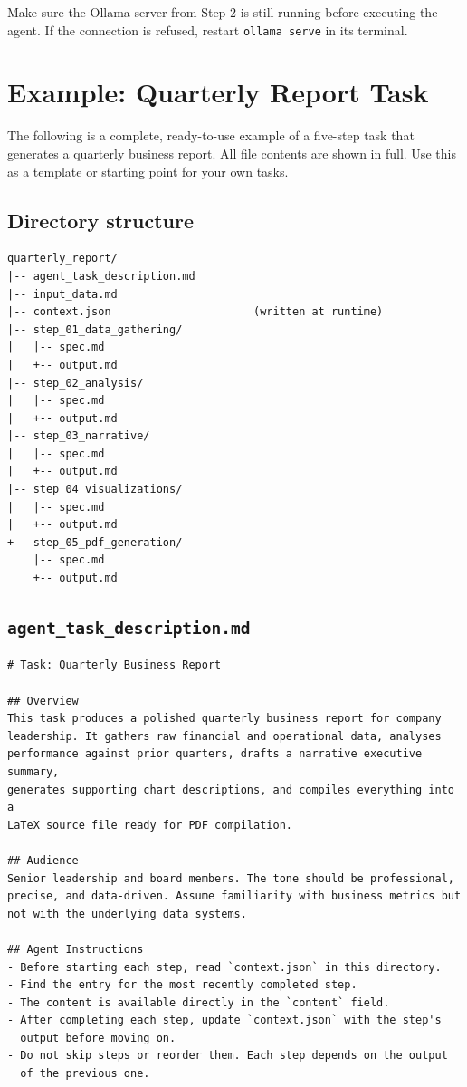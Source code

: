\documentclass[12pt, a4paper]{article}
\begin{document}
\begin{warnbox}
Make sure the Ollama server from Step 2 is still running before executing the agent. If the connection is refused, restart \texttt{ollama serve} in its terminal.
\end{warnbox}

\clearpage
\section{Example: Quarterly Report Task}
\label{appendix:example}

The following is a complete, ready-to-use example of a five-step task that generates a quarterly business report. All file contents are shown in full. Use this as a template or starting point for your own tasks.

\subsection{Directory structure}

\begin{lstlisting}
quarterly_report/
|-- agent_task_description.md
|-- input_data.md
|-- context.json                      (written at runtime)
|-- step_01_data_gathering/
|   |-- spec.md
|   +-- output.md
|-- step_02_analysis/
|   |-- spec.md
|   +-- output.md
|-- step_03_narrative/
|   |-- spec.md
|   +-- output.md
|-- step_04_visualizations/
|   |-- spec.md
|   +-- output.md
+-- step_05_pdf_generation/
    |-- spec.md
    +-- output.md
\end{lstlisting}

\subsection{\texttt{agent\_task\_description.md}}

\begin{lstlisting}[language={}]
# Task: Quarterly Business Report

## Overview
This task produces a polished quarterly business report for company
leadership. It gathers raw financial and operational data, analyses
performance against prior quarters, drafts a narrative executive summary,
generates supporting chart descriptions, and compiles everything into a
LaTeX source file ready for PDF compilation.

## Audience
Senior leadership and board members. The tone should be professional,
precise, and data-driven. Assume familiarity with business metrics but
not with the underlying data systems.

## Agent Instructions
- Before starting each step, read `context.json` in this directory.
- Find the entry for the most recently completed step.
- The content is available directly in the `content` field.
- After completing each step, update `context.json` with the step's
  output before moving on.
- Do not skip steps or reorder them. Each step depends on the output
  of the previous one.
\end{lstlisting}
\end{document}
